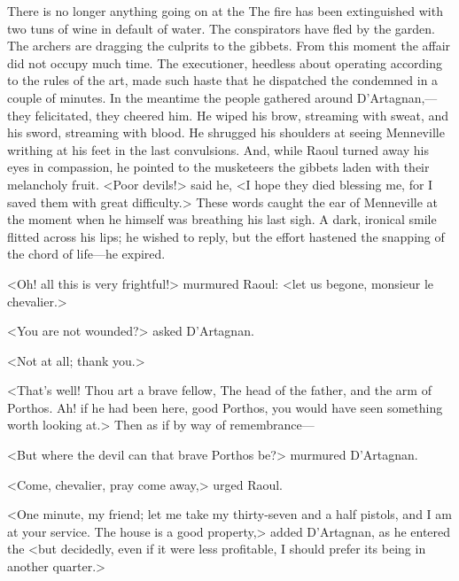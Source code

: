 There is no longer anything going on at the  The fire has been extinguished with two tuns of wine in default of water. The conspirators have fled by the garden. The archers are dragging the culprits to the gibbets. From this moment the affair did not occupy much time. The executioner, heedless about operating according to the rules of the art, made such haste that he dispatched the condemned in a couple of minutes. In the meantime the people gathered around D'Artagnan,—they felicitated, they cheered him. He wiped his brow, streaming with sweat, and his sword, streaming with blood. He shrugged his shoulders at seeing Menneville writhing at his feet in the last convulsions. And, while Raoul turned away his eyes in compassion, he pointed to the musketeers the gibbets laden with their melancholy fruit. <Poor devils!> said he, <I hope they died blessing me, for I saved them with great difficulty.> These words caught the ear of Menneville at the moment when he himself was breathing his last sigh. A dark, ironical smile flitted across his lips; he wished to reply, but the effort hastened the snapping of the chord of life—he expired.

<Oh! all this is very frightful!> murmured Raoul: <let us begone, monsieur le chevalier.>

<You are not wounded?> asked D'Artagnan.

<Not at all; thank you.>

<That's well! Thou art a brave fellow,  The head of the father, and the arm of Porthos. Ah! if he had been here, good Porthos, you would have seen something worth looking at.> Then as if by way of remembrance—

<But where the devil can that brave Porthos be?> murmured D'Artagnan.

<Come, chevalier, pray come away,> urged Raoul.

<One minute, my friend; let me take my thirty-seven and a half pistols, and I am at your service. The house is a good property,> added D'Artagnan, as he entered the  <but decidedly, even if it were less profitable, I should prefer its being in another quarter.> 